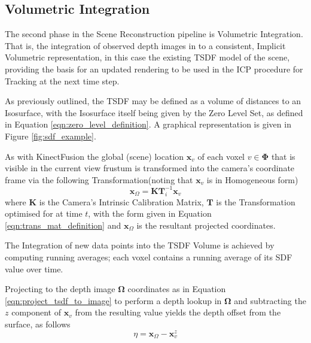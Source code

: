 \subsection{Volumetric Integration}
\label{subsec:moseg_static_integration}
The second phase in the Scene Reconstruction pipeline is Volumetric Integration.
That is, the integration of observed depth images in to a consistent, Implicit
Volumetric representation, in this case the existing TSDF model of the scene,
providing the basis for an updated rendering to be used in the ICP procedure
for Tracking at the next time step.

As previously outlined, the TSDF may be defined as a volume of distances to an
Isosurface, with the Isosurface itself being given by the Zero Level Set, as
defined in Equation \ref{eqn:zero_level_definition}. A graphical representation
is given in Figure \ref{fig:sdf_example}.

As with KinectFusion \cite{Newcombe2011} the global (scene) location
$\mathbf{x}_{v}$ of each voxel $v \in \mathbf{\Phi}$ that is visible in the
current view frustum is transformed into the camera's coordinate frame via the
following Transformation(noting that $\mathbf{x}_{v}$ is in Homogeneous form)
\begin{equation}
\label{eqn:project_tsdf_to_image}
\mathbf{x}_{\Omega} = \mathbf{K}\mathbf{T}_i^{-1}\mathbf{x}_{v}
\end{equation}
where $\mathbf{K}$ is the Camera's Intrinsic Calibration Matrix, $\mathbf{T}$ is
the Transformation optimised for at time $t$, with the form given in Equation
\ref{eqn:trans_mat_definition} and $\mathbf{x}_{\Omega}$ is the resultant
projected coordinates.

The Integration of new data points into the TSDF Volume is achieved by computing 
running averages; each voxel contains a running average of its SDF value over
time.

Projecting to the depth image $\mathbf{\Omega}$ coordinates as in Equation
\ref{eqn:project_tsdf_to_image} to perform a depth lookup in $\mathbf{\Omega}$
and subtracting the $z$ component of $\mathbf{x}_{v}$ from the resulting value
yields the depth offset from the surface, as follows
\begin{equation}
  \label{eqn:integration_offset}
  \eta = \mathbf{x}_{\Omega} - \mathbf{x}_{v}^{z}
\end{equation}

